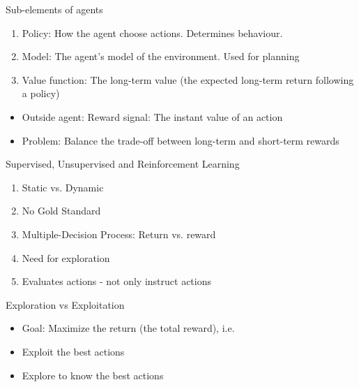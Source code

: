 \documentclass[10pt]{beamer}
\begin{document}
\begin{frame}{Sub-elements of agents}

\begin{enumerate}
\item {\color{uured} Policy}: How the agent choose actions. Determines behaviour.
\item {\color{uured} Model}: The agent's model of the environment. Used for {\color{uured} planning}\pause
\item {\color{uured} Value function}: The long-term value (the expected long-term return following a policy)
\end{enumerate}
\pause
\begin{itemize}
\item Outside agent: {\color{uured} Reward signal}: The instant value of an action\pause
\item Problem: {\color{uured} Balance} the trade-off between long-term and short-term rewards
\end{itemize}

\end{frame}

\begin{frame}{Supervised, Unsupervised and Reinforcement Learning}

\begin{enumerate}
\item Static vs. Dynamic \pause
\item No Gold Standard \pause
\item Multiple-Decision Process: Return vs. reward\pause
\item Need for exploration\pause
\item Evaluates actions - not only instruct actions
\end{enumerate}

\end{frame}

\begin{frame}{Exploration vs Exploitation}

\begin{itemize}
\item {\color{uured} Goal}: Maximize the return (the total reward), i.e.\pause
\item {\color{uured} Exploit} the best actions\pause
\item {\color{uured} Explore} to know the best actions
\end{itemize}

\end{frame}
\end{document}
